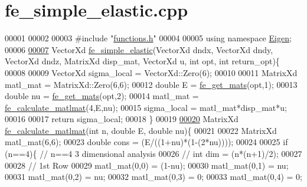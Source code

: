 \hypertarget{fe__simple__elastic_8cpp_source}{}\section{fe\+\_\+simple\+\_\+elastic.\+cpp}
\label{fe__simple__elastic_8cpp_source}

\begin{DoxyCode}
00001 
00002 
00003 \textcolor{preprocessor}{#include "\hyperlink{functions_8h}{functions.h}"}
00004 
00005 \textcolor{keyword}{using namespace }\hyperlink{namespace_eigen}{Eigen};
00006 
\hyperlink{fe__simple__elastic_8cpp_ab0911abb05a0ca06eb4f330890ee0641}{00007} VectorXd \hyperlink{fe__simple__elastic_8cpp_ab0911abb05a0ca06eb4f330890ee0641}{fe\_simple\_elastic}(VectorXd dndx, VectorXd dndy, VectorXd dndz, MatrixXd disp\_mat,
       VectorXd u, \textcolor{keywordtype}{int} opt, \textcolor{keywordtype}{int} return\_opt)\{
00008     
00009     VectorXd sigma\_local = VectorXd::Zero(6);
00010 
00011     MatrixXd matl\_mat = MatrixXd::Zero(6,6);
00012     \textcolor{keywordtype}{double} E = \hyperlink{functions_8h_af7ffbad6dfcc99fc88b130c1a7b1720a}{fe\_get\_mats}(opt,1);
00013     \textcolor{keywordtype}{double} nu = \hyperlink{functions_8h_af7ffbad6dfcc99fc88b130c1a7b1720a}{fe\_get\_mats}(opt,2);
00014     matl\_mat = \hyperlink{fe__simple__elastic_8cpp_abbc5cafd6bb8048b69b3bd6f26ceb5f8}{fe\_calculate\_matlmat}(4,E,nu);
00015     sigma\_local = matl\_mat*disp\_mat*u;
00016 
00017     \textcolor{keywordflow}{return} sigma\_local;
00018 \}
00019 
\hyperlink{fe__simple__elastic_8cpp_abbc5cafd6bb8048b69b3bd6f26ceb5f8}{00020} MatrixXd \hyperlink{fe__simple__elastic_8cpp_abbc5cafd6bb8048b69b3bd6f26ceb5f8}{fe\_calculate\_matlmat}(\textcolor{keywordtype}{int} n, \textcolor{keywordtype}{double} E, \textcolor{keywordtype}{double} nu)\{
00021 
00022     MatrixXd matl\_mat(6,6);
00023     \textcolor{keywordtype}{double} cons = (E/((1+nu)*(1-(2*nu))));
00024 
00025     \textcolor{keywordflow}{if} (n==4)\{ \textcolor{comment}{// n==4 3 dimensional analysis}
00026         \textcolor{comment}{// int dim = (n*(n+1)/2);}
00027 
00028         \textcolor{comment}{// 1st Row}
00029         matl\_mat(0,0) = (1-nu);
00030         matl\_mat(0,1) = nu;
00031         matl\_mat(0,2) = nu;
00032         matl\_mat(0,3) = 0;
00033         matl\_mat(0,4) = 0;

\end{DoxyCode}
